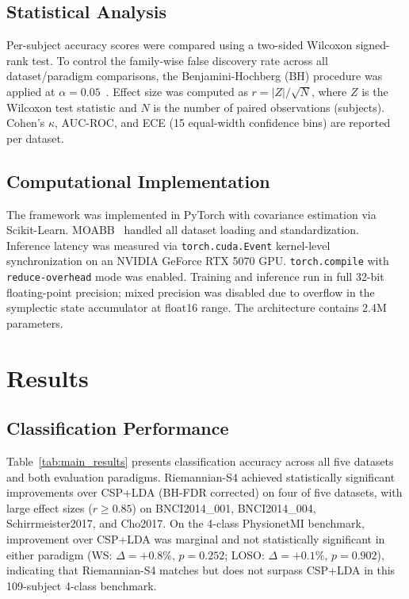 \documentclass[11pt,a4paper]{article}
\begin{document}
\subsection{Statistical Analysis}

Per-subject accuracy scores were compared using a two-sided Wilcoxon
signed-rank test.
To control the family-wise false discovery rate across all
dataset/paradigm comparisons, the Benjamini-Hochberg (BH) procedure was applied
at $\alpha = 0.05$~\cite{Benjamini1995}.
Effect size was computed as $r = |Z|/\sqrt{N}$, where $Z$ is the Wilcoxon
test statistic and $N$ is the number of paired observations (subjects).
Cohen's $\kappa$, AUC-ROC, and ECE (15 equal-width confidence bins) are
reported per dataset.

\subsection{Computational Implementation}

The framework was implemented in PyTorch with covariance estimation via
Scikit-Learn.
MOABB~\cite{Jayaram2018} handled all dataset loading and standardization.
Inference latency was measured via \texttt{torch.cuda.Event} kernel-level
synchronization on an NVIDIA GeForce RTX 5070 GPU.
\texttt{torch.compile} with \texttt{reduce-overhead} mode was enabled.
Training and inference run in full 32-bit floating-point precision; mixed
precision was disabled due to overflow in the symplectic state accumulator
at float16 range.
The architecture contains 2.4M parameters.

\section{Results}

\subsection{Classification Performance}

Table~\ref{tab:main_results} presents classification accuracy across all five
datasets and both evaluation paradigms.
Riemannian-S4 achieved statistically significant improvements over CSP+LDA
(BH-FDR corrected) on four of five datasets, with large effect sizes
($r \geq 0.85$) on BNCI2014\_001, BNCI2014\_004, Schirrmeister2017, and
Cho2017.
On the 4-class PhysionetMI benchmark, improvement over CSP+LDA was marginal
and not statistically significant in either paradigm
(WS: $\Delta = +0.8\%$, $p = 0.252$;
LOSO: $\Delta = +0.1\%$, $p = 0.902$), indicating that Riemannian-S4 matches
but does not surpass CSP+LDA in this 109-subject 4-class benchmark.
\end{document}
